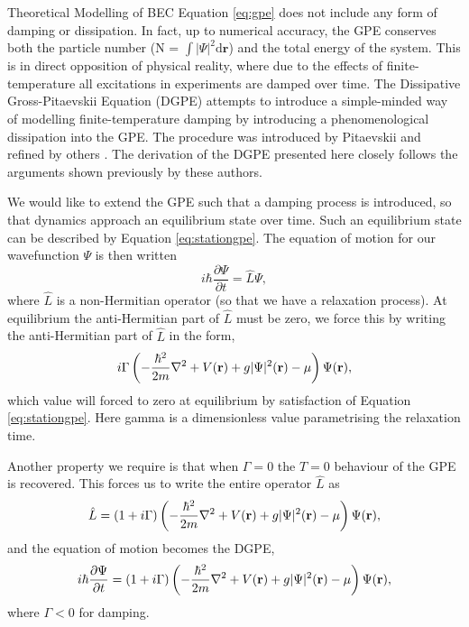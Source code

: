 \begin{chapter}{\label{cha:theoretical_model}Theoretical Modelling of BEC}
	Equation \ref{eq:gpe} does not include any form of damping or dissipation. In fact, up to numerical accuracy, the GPE conserves both the particle number (N = $\int |\Psi|^2 \mathrm{d}\mathbf{r}$) and the total energy of the system. This is in direct opposition of physical reality, where due to the effects of finite-temperature all excitations in experiments are damped over time. The Dissipative Gross-Pitaevskii Equation (DGPE) attempts to introduce a simple-minded way of modelling finite-temperature damping by introducing a phenomenological dissipation into the GPE. The procedure was introduced by Pitaevskii \cite{lifshitzpitaevskii81} and refined by others \cite{choi_morgan_98,tsubota_kasamatsu_02,madarassy_barenghi_08}. The derivation of the DGPE presented here closely follows the arguments shown previously by these authors.

	We would like to extend the GPE such that a damping process is introduced, so that dynamics approach an equilibrium state over time. Such an equilibrium state can be described by Equation \ref{eq:stationgpe}. The equation of motion for our wavefunction $\Psi$ is then written 
		\begin{equation}\label{eq:disseqmotion}
		i\hbar \frac{\partial \Psi}{\partial t} = \hat{L}\Psi,
		\end{equation}
	where $\hat{L}$ is a non-Hermitian operator (so that we have a relaxation process). At equilibrium the anti-Hermitian part of $\hat{L}$ must be zero, we force this by writing the anti-Hermitian part of $\hat{L}$ in the form,
	\begin{equation*}\label{eq:dissantiherm}
		i\Gamma\left( -\frac{\hbar^2}{2m}\nabla^2 + V({\bf r}) + g|\Psi|^2({\bf r}) - \mu \right) \Psi({\bf r}),
	\end{equation*}
	which value will forced to zero at equilibrium by satisfaction of Equation \ref{eq:stationgpe}. Here gamma is a dimensionless value parametrising the relaxation time.

	Another property we require is that when $\Gamma=0$ the $T=0$ behaviour of the GPE is recovered. This forces us to write the entire operator $\hat{L}$ as
	\begin{equation*}\label{eq:dissantiherm2}
		\hat{L} = (1+i\Gamma)\left( -\frac{\hbar^2}{2m}\nabla^2 + V({\bf r}) + g|\Psi|^2({\bf r}) - \mu \right) \Psi({\bf r}),
	\end{equation*}
	and the equation of motion becomes the DGPE,
	\begin{equation}\label{eq:dissgpeA}
		i\hbar \frac{\partial \Psi}{\partial t} = (1+i\Gamma)\left( -\frac{\hbar^2 }{2m}\nabla^2 + V({\bf r}) + g|\Psi|^2({\bf r}) - \mu \right) \Psi({\bf r}),
	\end{equation}
	where $\Gamma<0$ for damping.


\end{chapter}
